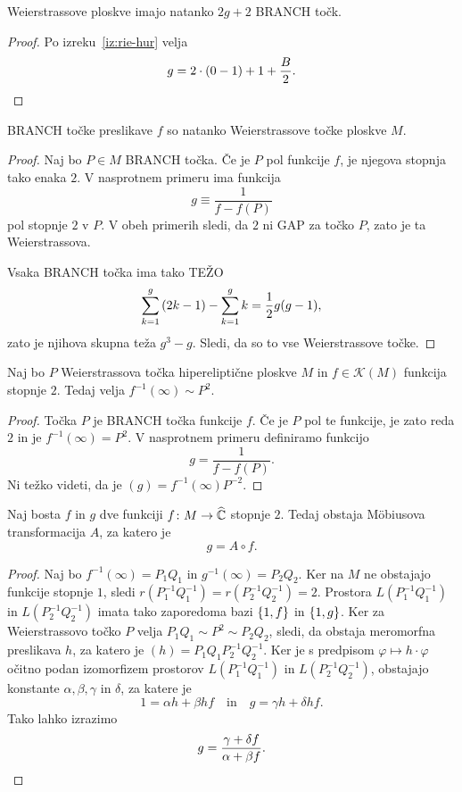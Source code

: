 \begin{trditev}
Weierstrassove ploskve imajo natanko $2g+2$ BRANCH točk.
\end{trditev}

\begin{proof}
Po izreku~\ref{iz:rie-hur} velja
\[
g = 2 \cdot (0-1) + 1 + \frac{B}{2}. \qedhere
\]
\end{proof}

\begin{trditev}
BRANCH točke preslikave $f$ so natanko Weierstrassove točke ploskve
$M$.
\end{trditev}

\begin{proof}
Naj bo $P \in M$ BRANCH točka. Če je $P$ pol funkcije $f$, je
njegova stopnja tako enaka $2$. V nasprotnem primeru ima funkcija
\[
g \equiv \frac{1}{f - f(P)}
\]
pol stopnje $2$ v $P$. V obeh primerih sledi, da $2$ ni GAP za
točko $P$, zato je ta Weierstrassova.

Vsaka BRANCH točka ima tako TEŽO
\[
\sum_{k=1}^g \left(2k-1\right) - \sum_{k=1}^g k = \frac{1}{2} g (g-1),
\]
zato je njihova skupna teža $g^3 - g$. Sledi, da so to vse
Weierstrassove točke.
\end{proof}

\begin{lema}
Naj bo $P$ Weierstrassova točka hipereliptične ploskve $M$ in
$f \in \mathscr{K}(M)$ funkcija stopnje $2$. Tedaj velja
$f^{-1}(\infty) \sim P^2$.
\end{lema}

\begin{proof}
Točka $P$ je BRANCH točka funkcije $f$. Če je $P$ pol te funkcije,
je zato reda $2$ in je $f^{-1}(\infty) = P^2$. V nasprotnem primeru
definiramo funkcijo
\[
g = \frac{1}{f - f(P)}.
\]
Ni težko videti, da je $(g) = f^{-1}(\infty) P^{-2}$.
\end{proof}

\begin{trditev}
Naj bosta $f$ in $g$ dve funkciji $f \colon M \to \widehat{\mathbb{C}}$ stopnje
$2$. Tedaj obstaja Möbiusova transformacija $A$, za katero je
\[
g = A \circ f.
\]
\end{trditev}

\begin{proof}
Naj bo $f^{-1}(\infty) = P_1 Q_1$ in $g^{-1}(\infty) = P_2 Q_2$.
Ker na $M$ ne obstajajo funkcije stopnje $1$, sledi
$r(P_1^{-1} Q_1^{-1}) = r(P_2^{-1} Q_2^{-1}) = 2$. Prostora
$L(P_1^{-1} Q_1^{-1})$ in $L(P_2^{-1} Q_2^{-1})$ imata tako
zaporedoma bazi $\left\{1, f\right\}$ in $\left\{1, g\right\}$. Ker za Weierstrassovo
točko $P$ velja $P_1 Q_1 \sim P^2 \sim P_2 Q_2$, sledi, da obstaja
meromorfna preslikava $h$, za katero je
$(h) = P_1 Q_1 P_2^{-1} Q_2^{-1}$. Ker je s predpisom
$\varphi \mapsto h \cdot \varphi$ očitno podan izomorfizem
prostorov $L(P_1^{-1} Q_1^{-1})$ in $L(P_2^{-1} Q_2^{-1})$,
obstajajo konstante $\alpha, \beta, \gamma$ in $\delta$, za katere
je
\[
1 = \alpha h + \beta hf
\quad \text{in} \quad
g = \gamma h + \delta hf.
\]
Tako lahko izrazimo
\[
g = \frac{\gamma + \delta f}{\alpha + \beta f}. \qedhere
\]
\end{proof}

